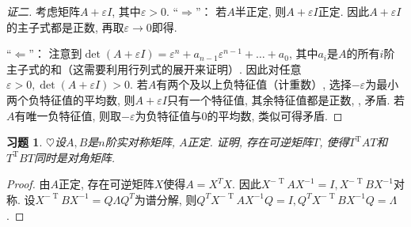 \documentclass{ctexart}
\newtheorem{exercise}[thm]{习题}
\def\hard{$\heartsuit$}
\DeclareMathOperator{\T}{T}
\begin{document}
\begin{proof}[证二]
	考虑矩阵$A+\varepsilon I$, 其中$\varepsilon>0$. 
	``$\Rightarrow$''：
	若$A$半正定, 则$A+\varepsilon I$正定. 因此$A+\varepsilon I$的主子式都是正数, 再取$\varepsilon \to 0$即得. 

	``$\Leftarrow$''：
	注意到$\det (A+\varepsilon I)=\varepsilon^n+a_{n-1}\varepsilon^{n-1}+\dots+a_0$, 其中$a_i$是$A$的所有$i$阶主子式的和（这需要利用行列式的展开来证明）. 
	因此对任意$\varepsilon>0,\det(A+\varepsilon I)>0$. 
	若$A$有两个及以上负特征值（计重数）, 选择$-\varepsilon$为最小两个负特征值的平均数, 则$A+\varepsilon I$只有一个特征值, 其余特征值都是正数, , 矛盾. 
	若$A$有唯一负特征值, 则取$-\varepsilon$为负特征值与$0$的平均数, 类似可得矛盾. 
\end{proof}

\begin{exercise}\label{excs:6.2.18}
\hard 设$A, B$是$n$阶实对称矩阵, $A$正定. 
证明, 存在可逆矩阵$T$, 使得$T^{\T}AT$和$T^{\T}BT$同时是对角矩阵. 
\end{exercise}
\begin{proof}
	由$A$正定, 存在可逆矩阵$X$使得$A=X^TX$. 因此$X^{-\T}AX^{-1}=I,X^{-\T}BX^{-1}$对称. 设$X^{-\T}BX^{-1}=Q\Lambda Q^T$为谱分解, 则$Q^TX^{-\T}AX^{-1}Q=I,Q^TX^{-\T}BX^{-1}Q=\Lambda$. 
\end{proof}
\end{document}

